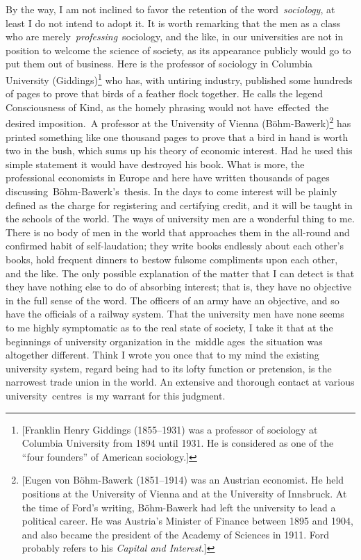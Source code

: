 \documentclass[openany,nobib]{tufte-book}
\begin{document}
By the way, I am not inclined to favor the retention of the
word~\emph{sociology}, at least I do not intend to adopt it. It is worth
remarking that the men as a class who are
merely~\emph{professing}~sociology, and the like, in our universities
are not in position to welcome the science of society, as its appearance
publicly would go to put them out of business. Here is the professor of
sociology in Columbia University (Giddings)\footnote{{[}Franklin Henry
  Giddings (1855--1931) was a professor of sociology at Columbia
  University from 1894 until 1931. He is considered as one of the ``four
  founders'' of American sociology.{]}} who has, with untiring industry,
published some hundreds of pages to prove that birds of a feather flock
together. He calls the legend Consciousness of Kind, as the homely
phrasing would not have~effected~the desired imposition.~A professor at
the University of Vienna (Böhm-Bawerk)\footnote{{[}Eugen von Böhm-Bawerk
  (1851--1914) was an Austrian economist. He held positions at the
  University of Vienna and at the University of Innsbruck. At the time
  of Ford's writing, Böhm-Bawerk had left the university to lead a
  political career. He was Austria's Minister of Finance between 1895
  and 1904, and also became the president of the Academy of Sciences in
  1911. Ford probably refers to his \emph{Capital and Interest}.{]}} has
printed something like one thousand pages to prove that a bird in hand
is worth two in the bush, which sums up his theory of economic interest.
Had he used this simple statement it would have destroyed his book. What
is more, the professional economists in Europe and here have written
thousands of pages discussing~Böhm-Bawerk's~thesis. In the days to come
interest will be plainly defined as the charge for registering and
certifying credit, and it will be taught in the schools of the world.
The ways of university men are a wonderful thing to me. There is no body
of men in the world that approaches them in the all-round and confirmed
habit of self-laudation; they write books endlessly about each other's
books, hold frequent dinners to bestow fulsome compliments upon each
other, and the like. The only possible explanation of the matter that I
can detect is that they have nothing else to do of absorbing interest;
that is, they have no objective in the full sense of the word. The
officers of an army have an objective, and so have the officials of a
railway system. That the university men have none seems to me highly
symptomatic as to the real state of society, I take it that at the
beginnings of university organization in the~middle ages~the situation
was altogether different. Think I wrote you once that to my mind the
existing university system, regard being had to its lofty function or
pretension, is the narrowest trade union in the world. An extensive and
thorough contact at various university~centres~is my warrant for this
judgment.~~
\end{document}
